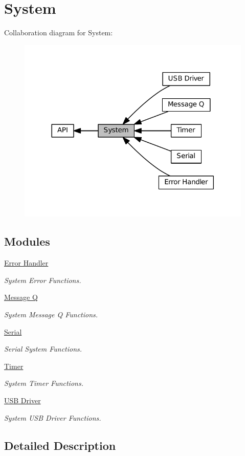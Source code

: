 \hypertarget{group__SYSTEM}{}\section{System}
\label{group__SYSTEM}
Collaboration diagram for System\+:\nopagebreak
\begin{figure}[H]
\begin{center}
\leavevmode
\includegraphics[width=317pt]{group__SYSTEM}
\end{center}
\end{figure}
\subsection*{Modules}
\begin{DoxyCompactItemize}
\item 
\hyperlink{group__SYSTEM__ERROR}{Error Handler}
\begin{DoxyCompactList}\small\item\em System Error Functions. \end{DoxyCompactList}\item 
\hyperlink{group__SYSTEM__MESSAGE__Q}{Message Q}
\begin{DoxyCompactList}\small\item\em System Message Q Functions. \end{DoxyCompactList}\item 
\hyperlink{group__SYSTEM__SERIAL__COMM}{Serial}
\begin{DoxyCompactList}\small\item\em Serial System Functions. \end{DoxyCompactList}\item 
\hyperlink{group__SYSTEM__TIMER}{Timer}
\begin{DoxyCompactList}\small\item\em System Timer Functions. \end{DoxyCompactList}\item 
\hyperlink{group__SYSTEM__USB__DRIVER}{U\+S\+B Driver}
\begin{DoxyCompactList}\small\item\em System U\+SB Driver Functions. \end{DoxyCompactList}\end{DoxyCompactItemize}


\subsection{Detailed Description}
